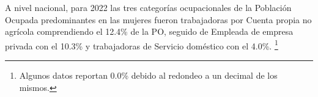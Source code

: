 \justifying A nivel nacional, para 2022 las tres categorías ocupacionales de la Población Ocupada predominantes en las mujeres fueron trabajadoras por Cuenta propia no agrícola comprendiendo el 12.4\% de la PO, seguido de Empleada de empresa privada con el 10.3\% y trabajadoras de Servicio doméstico con el 4.0\%. \footnote{Algunos datos reportan 0.0\% debido al redondeo a un decimal de los mismos.}
